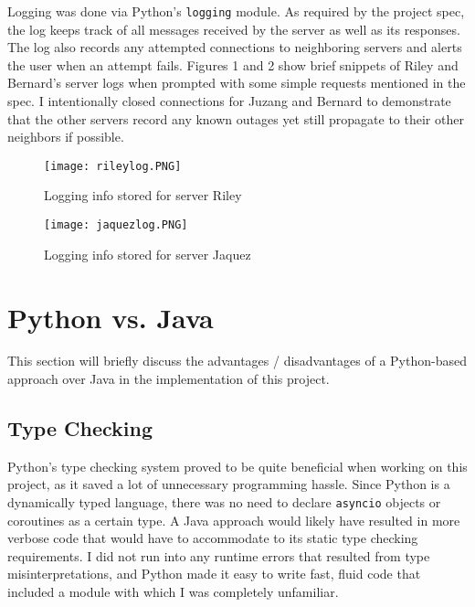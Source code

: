 Logging was done via Python's \verb +logging+ module. As required by the project spec, the log keeps track of all messages received by the server as well as its responses. The log also records any attempted connections to neighboring servers and alerts the user when an attempt fails. Figures 1 and 2 show brief snippets of Riley and Bernard's server logs when prompted with some simple requests mentioned in the spec. I intentionally closed connections for Juzang and Bernard to demonstrate that the other servers record any known outages yet still propagate to their other neighbors if possible.

\begin{figure}

\texttt{[image: rileylog.PNG]}
\caption{\label{fig:vectors} Logging info stored for server Riley}
\end{figure}


\begin{figure}

\texttt{[image: jaquezlog.PNG]}
\caption{\label{fig:vectors} Logging info stored for server Jaquez} 
\end{figure}



\section{Python vs. Java}
This section will briefly discuss the advantages / disadvantages of a Python-based approach over Java in the implementation of this project. 

\subsection{Type Checking}
Python's type checking system proved to be quite beneficial when working on this project, as it saved a lot of unnecessary programming hassle. Since Python is a dynamically typed language, there was no need to declare \verb +asyncio+ objects or coroutines as a certain type. A Java approach would likely have resulted in more verbose code that would have to accommodate to its static type checking requirements. I did not run into any runtime errors that resulted from type misinterpretations, and Python made it easy to write fast, fluid code that included a module with which I was completely unfamiliar.

